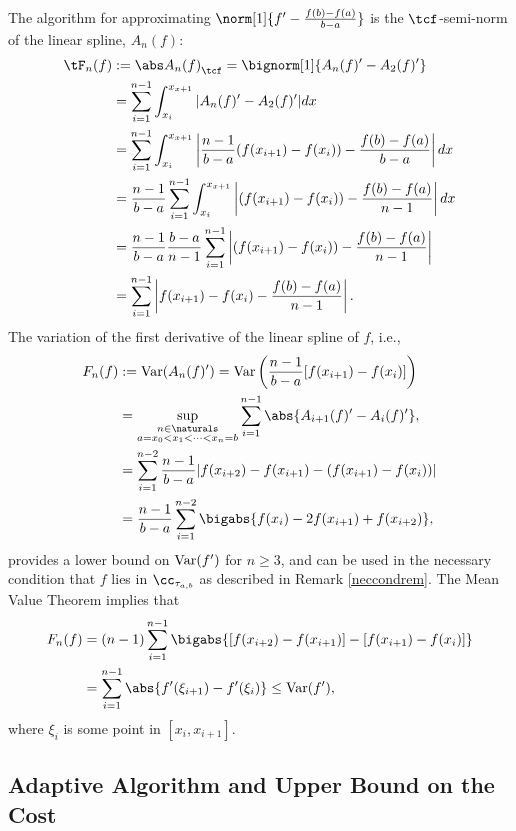 The algorithm for approximating $\norm[1]{f'-\frac{f(b)-f(a)}{b-a}}$ is the $\tcf$-semi-norm of the linear spline, $A_n(f)$:
\begin{align}
\nonumber
\tF_n(f)&:=\Ftnorm{A_n(f)}=\bignorm[1]{A_n(f)'-A_2(f)'} \\
\nonumber
&= \sum_{i=1}^{n-1}\int_{x_i}^{x_{x+1}}|A_n(f)'-A_2(f)'|dx\\
\nonumber
&=\sum_{i=1}^{n-1}\int_{x_i}^{x_{x+1}}\left|\frac{n-1}{b-a}(f(x_{i+1})-f(x_{i})) - \frac{f(b)-f(a)}{b-a}\right|dx\\
\nonumber
&=\frac{n-1}{b-a}\sum_{i=1}^{n-1}\int_{x_i}^{x_{x+1}}\left|(f(x_{i+1})-f(x_{i})) - \frac{f(b)-f(a)}{n-1}\right|dx\\
\nonumber
&=\frac{n-1}{b-a}\frac{b-a}{n-1}\sum_{i=1}^{n-1}\left|(f(x_{i+1})-f(x_{i})) - \frac{f(b)-f(a)}{n-1}\right|\\
\label{1direst}
&=\sum_{i=1}^{n-1}\left|f(x_{i+1})-f(x_{i}) - \frac{f(b)-f(a)}{n-1}\right|.
\end{align}
The variation of the first derivative of the linear spline of $f$, i.e.,
\begin{align}
\nonumber
F_n(f) &:=\Var(A_n(f)')=\Var\left(\frac{n-1}{b-a}[f(x_{i+1})-f(x_{i})]\right)\\
\nonumber
&= \sup_{\substack{n \in \naturals\\ a = x_0 < x_1 < \cdots < x_{n} =b}} \sum_{i=1}^{n-1} \abs{A_{i+1}(f)'-A_i(f)'}, \\
\nonumber
&=\sum_{i=1}^{n-2}\frac{n-1}{b-a}|f(x_{i+2}) - f(x_{i+1}) - (f(x_{i+1}) - f(x_i))|\\
\label{Fnormalg}
&= \frac{n-1}{b-a}\sum_{i=1}^{n-2} \bigabs{f(x_i) - 2 f(x_{i+1})+f(x_{i+2})},
\end{align}
provides a lower bound on $\operatorname{Var}(f')$ for $n \ge 3$, and can be used in the necessary condition that $f$ lies in $\cc_{\tau_{a,b}}$ as described in Remark \ref{neccondrem}.
The Mean Value Theorem implies that
\begin{align*}
F_n(f) &= (n-1)\sum_{i=1}^{n-1} \bigabs{[f(x_{i+2}) - f(x_{i+1})] - [f(x_{i+1}) - f(x_{i})]} \\
&= \sum_{i=1}^{n-1} \abs{f'(\xi_{i+1}) - f'(\xi_{i})} \le \Var(f'),
\end{align*}
where $\xi_i$ is some point in $[x_i,x_{i+1}]$.


\subsection{Adaptive Algorithm and Upper Bound on the Cost}

